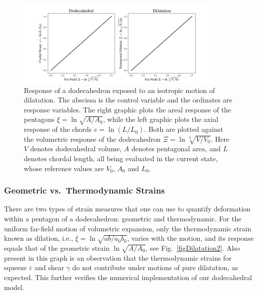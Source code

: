 \begin{figure}
	\centering
	\includegraphics[width=0.9\textwidth]{figures/dilatation.jpg}
	\caption{Response of a dodecahedron exposed to an isotropic motion of dilatation.  The abscissa is the control variable and the ordinates are response variables. The right graphic plots the areal response of the pentagons $\xi = \ln \sqrt{A / A_0}$, while the left graphic plots the axial response of the chords $e = \ln ( L / L_0)$. Both are plotted against the volumetric response of the dodecahedron $\Xi = \ln \sqrt[3]{V \! / V_0}$.  Here $V$ denotes dodecahedral volume, $A$ denotes pentagonal area, and $L$ denotes chordal length, all being evaluated in the current state, whose reference values are $V_0$, $A_0$ and $L_0$.}
	\label{figDilatation}
\end{figure}

\subsubsection{Geometric vs.\ Thermodynamic Strains}

There are two types of strain measures that one can use to quantify deformation within a pentagon of a dodecahedron: geometric and thermo\-dynamic.  For the uniform far-field motion of volumetric expansion, only the thermo\-dynamic strain known as dilation, i.e., $\xi = \ln \sqrt{ab/a_0b_0}$, varies with the motion, and its response equals that of the geometric strain $\ln \sqrt{A / A_0}$, see Fig.~\ref{figDilatation2}.  Also present in this graph is an observation that the thermo\-dynamic strains for squeeze $\varepsilon$ and shear $\gamma$ do not contribute under motions of pure dilatation, as expected.  This further verifies the numerical implementation of our dodecahedral model.

